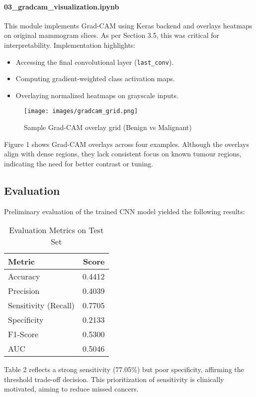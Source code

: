 \documentclass[12pt]{article}
\begin{document}
\paragraph{03\_gradcam\_visualization.ipynb}
This module implements Grad-CAM using Keras backend and overlays heatmaps on original mammogram slices. As per Section 3.5, this was critical for interpretability. Implementation highlights:
\begin{itemize}
    \item Accessing the final convolutional layer (\texttt{last\_conv}).
    \item Computing gradient-weighted class activation maps.
    \item Overlaying normalized heatmaps on grayscale inputs.
\end{itemize}
\begin{figure}[H]
\centering
\texttt{[image: images/gradcam\_grid.png]}
\caption{Sample Grad-CAM overlay grid (Benign vs Malignant)}
\end{figure}
Figure 1 shows Grad-CAM overlays across four examples. Although the overlays align with dense regions, they lack consistent focus on known tumour regions, indicating the need for better contrast or tuning.

\subsection{Evaluation}
Preliminary evaluation of the trained CNN model yielded the following results:

\begin{table}[H]
\centering
\caption{Evaluation Metrics on Test Set}
\begin{tabular}{lr}
\toprule
Metric & Score \\
\midrule
Accuracy & 0.4412 \\
Precision & 0.4039 \\
Sensitivity (Recall) & 0.7705 \\
Specificity & 0.2133 \\
F1-Score & 0.5300 \\
AUC & 0.5046 \\
\bottomrule
\end{tabular}
\end{table}

Table 2 reflects a strong sensitivity (77.05\%) but poor specificity, affirming the threshold trade-off decision. This prioritization of sensitivity is clinically motivated, aiming to reduce missed cancers.
\end{document}
